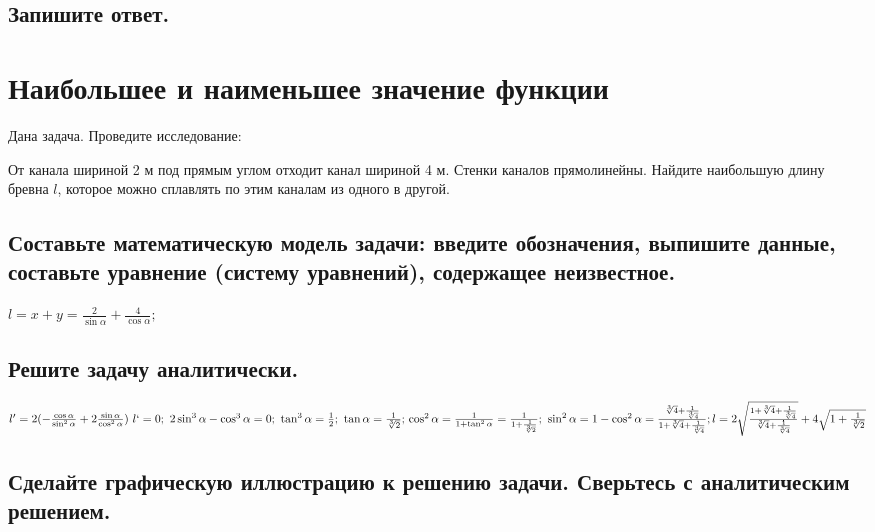 \documentclass[a4paper,12pt]{article}
\begin{document}
\subsection{Запишите ответ.}

\section{Наибольшее и наименьшее значение функции}
Дана задача. Проведите исследование:

От канала шириной 2 м под прямым углом отходит канал шириной 4 м. Стенки каналов прямолинейны. Найдите наибольшую длину бревна $l$, которое можно сплавлять по этим каналам из одного в другой.

\subsection{Составьте математическую модель задачи: введите обозначения, выпишите данные, составьте уравнение (систему уравнений), содержащее неизвестное.}

$l=x+y=\frac2{\sin\alpha}+\frac4{\cos\alpha};$

\subsection{Решите задачу аналитически.}
$l'=2(-\frac{\cos\alpha}{\sin^2\alpha}+2\frac{\sin\alpha}{\cos^2\alpha})\ 
l`=0;\ 2\sin^3\alpha-\cos^3\alpha=0;\ 
\tan^3\alpha=\frac{1}{2};\ \tan\alpha=\frac{1}{\sqrt[3]{2}};\\
\cos^2\alpha=\frac{1}{1+\tan^2\alpha}=
\frac{1}{1+\frac{1}{\sqrt[3]{2}}};\ 
\sin^2\alpha=1-\cos^2\alpha=
\frac{\sqrt[3]{4}+\frac{1}{\sqrt[3]{4}}}
	{1+\sqrt[3]{4}+\frac{1}{\sqrt[3]{4}}};\\
l=2\sqrt{\mathstrut{\frac{1+\sqrt[3]{4}+\frac{1}{\sqrt[3]{4}}}
	{\sqrt[3]{4}+\frac{1}{\sqrt[3]{4}}}}}+
	4\sqrt{\mathstrut{1+\frac{1}{\sqrt[3]{2}}}}$

\subsection{Сделайте графическую иллюстрацию к решению задачи. Сверьтесь с аналитическим решением.}

\end{document}
